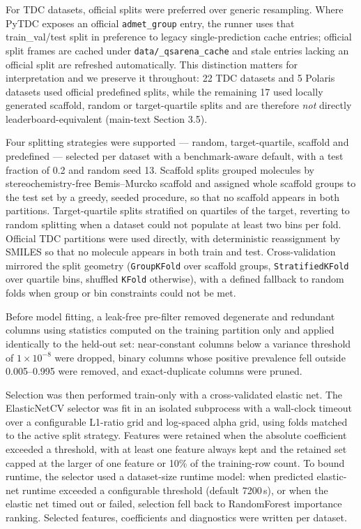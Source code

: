 \documentclass[11pt,a4paper]{article}
\begin{document}
For TDC datasets, official splits were preferred over generic resampling. Where PyTDC exposes an official \texttt{admet\_group} entry, the runner uses that train\_val/test split in preference to legacy single-prediction cache entries; official split frames are cached under \texttt{data/\_qsarena\_cache} and stale entries lacking an official split are refreshed automatically. This distinction matters for interpretation and we preserve it throughout: 22 TDC datasets and 5 Polaris datasets used official predefined splits, while the remaining 17 used locally generated scaffold, random or target-quartile splits and are therefore \emph{not} directly leaderboard-equivalent (main-text Section 3.5).

Four splitting strategies were supported --- random, target-quartile, scaffold and predefined --- selected per dataset with a benchmark-aware default, with a test fraction of 0.2 and random seed 13. Scaffold splits grouped molecules by stereochemistry-free Bemis--Murcko scaffold \cite{bemis1996properties} and assigned whole scaffold groups to the test set by a greedy, seeded procedure, so that no scaffold appears in both partitions. Target-quartile splits stratified on quartiles of the target, reverting to random splitting when a dataset could not populate at least two bins per fold. Official TDC partitions were used directly, with deterministic reassignment by SMILES so that no molecule appears in both train and test. Cross-validation mirrored the split geometry (\texttt{GroupKFold} over scaffold groups, \texttt{StratifiedKFold} over quartile bins, shuffled \texttt{KFold} otherwise), with a defined fallback to random folds when group or bin constraints could not be met.

Before model fitting, a leak-free pre-filter removed degenerate and redundant columns using statistics computed on the training partition only and applied identically to the held-out set: near-constant columns below a variance threshold of $1\times10^{-8}$ were dropped, binary columns whose positive prevalence fell outside 0.005--0.995 were removed, and exact-duplicate columns were pruned.

Selection was then performed train-only with a cross-validated elastic net. The ElasticNetCV selector was fit in an isolated subprocess with a wall-clock timeout over a configurable L1-ratio grid and log-spaced alpha grid, using folds matched to the active split strategy. Features were retained when the absolute coefficient exceeded a threshold, with at least one feature always kept and the retained set capped at the larger of one feature or 10\% of the training-row count. To bound runtime, the selector used a dataset-size runtime model: when predicted elastic-net runtime exceeded a configurable threshold (default 7200\,s), or when the elastic net timed out or failed, selection fell back to RandomForest importance ranking. Selected features, coefficients and diagnostics were written per dataset.
\end{document}
